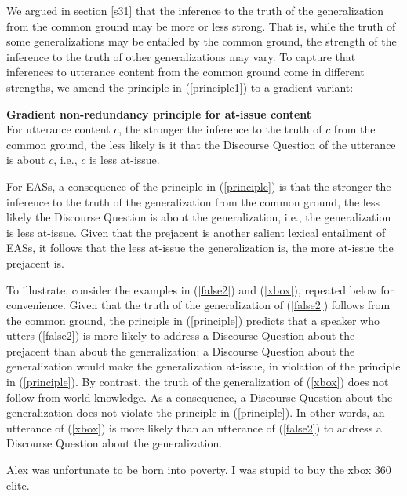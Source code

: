 \documentclass[11pt,fleqn]{article}
\newcommand{\6}{\mbox{$[\hspace*{-.6mm}[$}}
\newcommand{\9}{\mbox{$]\hspace*{-.6mm}]$}}
\begin{document}
We argued in section \ref{s31} that the inference to the truth of the generalization from the common ground may be more or less strong. That is, while the truth of some generalizations may be entailed by the common ground, the strength of the inference to the truth of other generalizations may vary. To capture that inferences to utterance content from the common ground come in different strengths, we amend the principle in (\ref{principle1}) to a gradient variant:

\begin{exe}

\ex\label{principle} {\bf Gradient non-redundancy principle for at-issue content} \\ For utterance content $c$, the stronger the inference to the truth of $c$ from the common ground, the less likely is it that the Discourse Question of the utterance is about $c$, i.e., $c$ is less at-issue.

\end{exe}

For EASs, a consequence of the principle in (\ref{principle}) is that the stronger the inference to the truth of the generalization from the common ground, the less likely the Discourse Question is about the generalization, i.e., the generalization is less at-issue. Given that the prejacent is another salient lexical entailment of EASs, it follows that the less at-issue the generalization is, the more at-issue the prejacent is.

To illustrate, consider the examples in (\ref{false2}) and (\ref{xbox}), repeated below for convenience. Given that the truth of the generalization of (\ref{false2}) follows from the common ground, the principle in (\ref{principle}) predicts that a speaker who utters (\ref{false2}) is more likely to address a Discourse Question about the prejacent than about the generalization: a Discourse Question about the generalization would make the generalization at-issue, in violation of the principle in (\ref{principle}). By contrast, the truth of the generalization of (\ref{xbox}) does not follow from world knowledge. As a consequence, a Discourse Question about the generalization does not violate the principle in (\ref{principle}). In other words, an utterance of (\ref{xbox}) is more likely than an utterance of (\ref{false2}) to address a Discourse Question about the generalization.

\begin{exe}
\ex\label{false2} Alex was unfortunate to be born into poverty.
\exi{(\ref{xbox})} I was stupid to buy the xbox 360 elite.
\end{exe}
\end{document}
